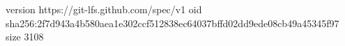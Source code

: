 version https://git-lfs.github.com/spec/v1
oid sha256:2f7d943a4b580aea1e302ccf512838ec64037bffd02dd9ede08cb49a45345f97
size 3108
